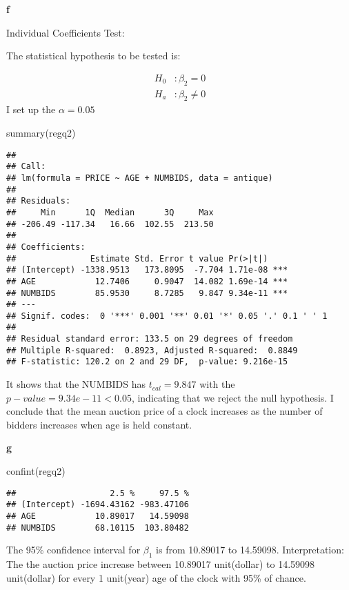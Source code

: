 \documentclass[
]{article}
\newenvironment{Shaded}{\begin{snugshade}}{\end{snugshade}}
\newcommand{\FunctionTok}[1]{\textcolor[rgb]{0.00,0.00,0.00}{#1}}
\newcommand{\NormalTok}[1]{#1}
\begin{document}
\textbf{f}

Individual Coefficients Test:

The statistical hypothesis to be tested is:

\[
\begin{aligned}
H_0&:\beta_2=0\\
H_a&:\beta_2\neq0
\end{aligned}
\] I set up the \(\alpha = 0.05\)

\begin{Shaded}
\begin{Highlighting}[]
\FunctionTok{summary}\NormalTok{(regq2)}
\end{Highlighting}
\end{Shaded}

\begin{verbatim}
## 
## Call:
## lm(formula = PRICE ~ AGE + NUMBIDS, data = antique)
## 
## Residuals:
##     Min      1Q  Median      3Q     Max 
## -206.49 -117.34   16.66  102.55  213.50 
## 
## Coefficients:
##               Estimate Std. Error t value Pr(>|t|)    
## (Intercept) -1338.9513   173.8095  -7.704 1.71e-08 ***
## AGE            12.7406     0.9047  14.082 1.69e-14 ***
## NUMBIDS        85.9530     8.7285   9.847 9.34e-11 ***
## ---
## Signif. codes:  0 '***' 0.001 '**' 0.01 '*' 0.05 '.' 0.1 ' ' 1
## 
## Residual standard error: 133.5 on 29 degrees of freedom
## Multiple R-squared:  0.8923, Adjusted R-squared:  0.8849 
## F-statistic: 120.2 on 2 and 29 DF,  p-value: 9.216e-15
\end{verbatim}

It shows that the NUMBIDS has \(t_{cal}=9.847\) with the
\(p-value= 9.34e-11 < 0.05\), indicating that we reject the null
hypothesis. I conclude that the mean auction price of a clock increases
as the number of bidders increases when age is held constant.

\textbf{g}

\begin{Shaded}
\begin{Highlighting}[]
\FunctionTok{confint}\NormalTok{(regq2)}
\end{Highlighting}
\end{Shaded}

\begin{verbatim}
##                   2.5 %     97.5 %
## (Intercept) -1694.43162 -983.47106
## AGE            10.89017   14.59098
## NUMBIDS        68.10115  103.80482
\end{verbatim}

The 95\% confidence interval for \(\beta_1\) is from 10.89017 to
14.59098. Interpretation: The the auction price increase between
10.89017 unit(dollar) to 14.59098 unit(dollar) for every 1 unit(year)
age of the clock with 95\% of chance.
\end{document}

